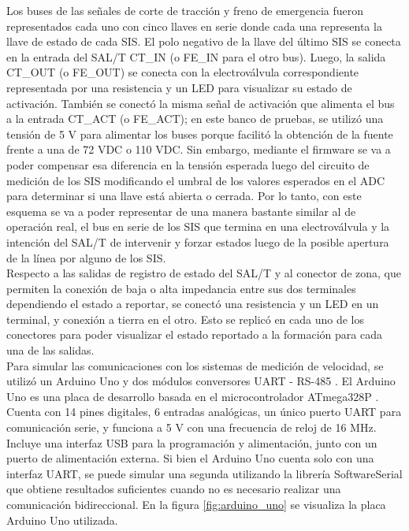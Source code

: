 Los buses de las señales de corte de tracción y freno de emergencia fueron representados cada uno con cinco llaves en serie donde cada una representa la llave de estado de cada SIS. El polo negativo de la llave del último SIS se conecta en la entrada del SAL/T CT\_IN (o FE\_IN para el otro bus). Luego, la salida CT\_OUT (o FE\_OUT) se conecta con la electroválvula correspondiente representada por una resistencia y un LED para visualizar su estado de activación. También se conectó la misma señal de activación que alimenta el bus a la entrada CT\_ACT (o FE\_ACT); en este banco de pruebas, se utilizó una tensión de 5 V para alimentar los buses porque facilitó la obtención de la fuente frente a una de 72 VDC o 110 VDC. Sin embargo, mediante el firmware se va a poder compensar esa diferencia en la tensión esperada luego del circuito de medición de los SIS modificando el umbral de los valores esperados en el ADC para determinar si una llave está abierta o cerrada. Por lo tanto, con este esquema se va a poder representar de una manera bastante similar al de operación real, el bus en serie de los SIS que termina en una electroválvula y la intención del SAL/T de intervenir y forzar estados luego de la posible apertura de la línea por alguno de los SIS. \\

Respecto a las salidas de registro de estado del SAL/T y al conector de zona, que permiten la conexión de baja o alta impedancia entre sus dos terminales dependiendo el estado a reportar, se conectó una resistencia y un LED en un terminal, y conexión a tierra en el otro. Esto se replicó en cada uno de los conectores para poder visualizar el estado reportado a la formación para cada una de las salidas. \\ 


Para simular las comunicaciones con los sistemas de medición de velocidad, se utilizó un Arduino Uno \cite{arduino_uno} y dos módulos conversores UART - RS-485 \cite{conversor_rs485}. El Arduino Uno es una placa de desarrollo basada en el microcontrolador ATmega328P \cite{atmega328}. Cuenta con 14 pines digitales, 6 entradas analógicas, un único puerto UART para comunicación serie, y funciona a 5 V con una frecuencia de reloj de 16 MHz. Incluye una interfaz USB para la programación y alimentación, junto con un puerto de alimentación externa. Si bien el Arduino Uno cuenta solo con una interfaz UART, se puede simular una segunda utilizando la librería SoftwareSerial \cite{swSerial} que obtiene resultados suficientes cuando no es necesario realizar una comunicación bidireccional. En la figura \ref{fig:arduino_uno} se visualiza la placa Arduino Uno utilizada. 

